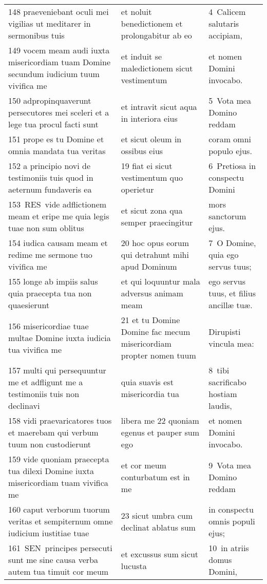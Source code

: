 \documentclass{article}
\begin{document}
\begin{longtable}{@{}p{}p{}p{}@{}}
148 praeveniebant oculi mei vigilias ut meditarer in sermonibus tuis	&	et noluit benedictionem et prolongabitur ab eo	&	4 Calicem salutaris accipiam,	\\
149 vocem meam audi iuxta misericordiam tuam Domine secundum iudicium tuum vivifica me	&	et induit se maledictionem sicut vestimentum	&	et nomen Domini invocabo.	\\
150 adpropinquaverunt persecutores mei sceleri et a lege tua procul facti sunt	&	et intravit sicut aqua in interiora eius	&	5 Vota mea Domino reddam	\\
151 prope es tu Domine et omnia mandata tua veritas	&	et sicut oleum in ossibus eius	&	coram omni populo ejus.	\\
152 a principio novi de testimoniis tuis quod in aeternum fundaveris ea	&	19 fiat ei sicut vestimentum quo operietur	&	6 Pretiosa in conspectu Domini	\\
153 RES vide adflictionem meam et eripe me quia legis tuae non sum oblitus	&	et sicut zona qua semper praecingitur	&	mors sanctorum ejus.	\\
154 iudica causam meam et redime me sermone tuo vivifica me	&	20 hoc opus eorum qui detrahunt mihi apud Dominum	&	7 O Domine, quia ego servus tuus;	\\
155 longe ab impiis salus quia praecepta tua non quaesierunt	&	et qui loquuntur mala adversus animam meam	&	ego servus tuus, et filius ancillæ tuæ.	\\
156 misericordiae tuae multae Domine iuxta iudicia tua vivifica me	&	21 et tu Domine Domine fac mecum misericordiam propter nomen tuum	&	Dirupisti vincula mea:	\\
157 multi qui persequuntur me et adfligunt me a testimoniis tuis non declinavi	&	quia suavis est misericordia tua	&	8 tibi sacrificabo hostiam laudis,	\\
158 vidi praevaricatores tuos et maerebam qui verbum tuum non custodierunt	&	libera me 22 quoniam egenus et pauper sum ego	&	et nomen Domini invocabo.	\\
159 vide quoniam praecepta tua dilexi Domine iuxta misericordiam tuam vivifica me	&	et cor meum conturbatum est in me	&	9 Vota mea Domino reddam	\\
160 caput verborum tuorum veritas et sempiternum omne iudicium iustitiae tuae	&	23 sicut umbra cum declinat ablatus sum	&	in conspectu omnis populi ejus;	\\
161 SEN principes persecuti sunt me sine causa verba autem tua timuit cor meum	&	et excussus sum sicut lucusta	&	10 in atriis domus Domini,	\\

\end{longtable}
\end{document}
